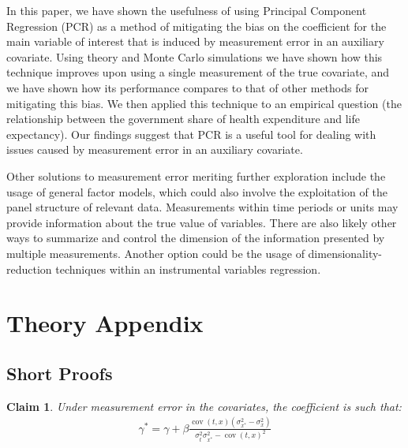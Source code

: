 \documentclass[10pt]{article}
\newtheorem{claim}{Claim}
\begin{document}
        In this paper, we have shown the usefulness of using Principal Component Regression (PCR) as a method of mitigating the bias on the coefficient for the main variable of interest that is induced by measurement error in an auxiliary covariate. Using theory and Monte Carlo simulations we have shown how this technique improves upon using a single measurement of the true covariate, and we have shown how its performance compares to that of other methods for mitigating this bias. We then applied this technique to an empirical question (the relationship between the government share of health expenditure and life expectancy). Our findings suggest that PCR is a useful tool for dealing with issues caused by measurement error in an auxiliary covariate.

        Other solutions to measurement error meriting further exploration include the usage of general factor models, which could also involve the exploitation of the panel structure of relevant data. Measurements within time periods or units may provide information about the true value of variables. There are also likely other ways to summarize and control the dimension of the information presented by multiple measurements. Another option could be the usage of dimensionality-reduction techniques within an instrumental variables regression.

    \clearpage \newpage

    
    

    \clearpage \newpage

    \appendix

	\section*{Theory Appendix}
	\subsection*{Short Proofs}

\setcounter{claim}{0}
\setcounter{claimproof}{0}

	\begin{claim}
	Under measurement error in the covariates, the coefficient is such that:
	\begin{align}
            \gamma^* = \gamma + \beta\frac{\operatorname{cov}(t,x)(\sigma^2_{x^*}-\sigma^2_x)}{\sigma_{t}^2\sigma_{x^*}^2-\operatorname{cov}({t,x})^2}
        \end{align}
	\end{claim}
	
\end{document}
